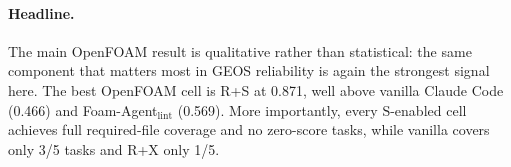 \documentclass{article}
\begin{document}
\begin{table}[t]
  \caption{OpenFOAM transfer-study summary on the 5-task subset. Mean score is the file-text-and-coverage metric described above. \emph{Full coverage} is the number of tasks for which all required files were produced; \emph{Pass@0.7} is the number of tasks with score $\geq 0.7$.}
  \label{tab:openfoam-summary}
  \centering
  \small
\end{table}

\paragraph{Headline.}
The main OpenFOAM result is qualitative rather than statistical: the same component that matters most in GEOS reliability is again the strongest signal here. The best OpenFOAM cell is R+S at 0.871, well above vanilla Claude Code (0.466) and Foam-Agent$_{\text{lint}}$ (0.569). More importantly, every $\mathrm{S}$-enabled cell achieves full required-file coverage and no zero-score tasks, while vanilla covers only 3/5 tasks and R+X only 1/5.
\end{document}
